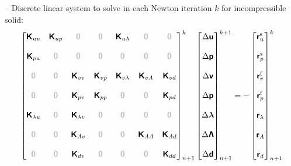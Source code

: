 \documentclass[a4paper,12pt]{report}
\newcommand{\bs}[1]{\boldsymbol{#1}}
\newcommand{\zerom}{\textcolor{lightgray}{\bs{\mathsf{0}}}}
\newcommand{\ROP}{\bs{\mathsf{r}}}
\newcommand{\LM}{\bs{\mathsf{\lambda}}}
\newcommand{\LMZ}{\bs{\mathsf{\Lambda}}}
\newcommand{\lmi}{\lambda} %
\newcommand{\lmzi}{\mathit{\Lambda}} %
\begin{document}
-- Discrete linear system to solve in each Newton iteration $k$ for incompressible solid:
\begin{equation}
\label{equation-lin-sys-fsi-0d-inc}
\begin{aligned}
\begin{bmatrix} \boldsymbol{\mathsf{K}}_{uu} & \boldsymbol{\mathsf{K}}_{up} & \zerom & \zerom & \boldsymbol{\mathsf{K}}_{u\lmi} & \zerom & \zerom \\ \\ \boldsymbol{\mathsf{K}}_{pu} & \zerom & \zerom & \zerom & \zerom & \zerom & \zerom \\ \\ \zerom & \zerom & \boldsymbol{\mathsf{K}}_{vv} & \boldsymbol{\mathsf{K}}_{vp} & \boldsymbol{\mathsf{K}}_{v\lmi} & \boldsymbol{\mathsf{K}}_{v\lmzi} & \boldsymbol{\mathsf{K}}_{vd} \\ \\ \zerom & \zerom & \boldsymbol{\mathsf{K}}_{pv} & \boldsymbol{\mathsf{K}}_{pp} & \zerom & \zerom & \boldsymbol{\mathsf{K}}_{pd} \\ \\ \boldsymbol{\mathsf{K}}_{\lmi u} & \zerom & \boldsymbol{\mathsf{K}}_{\lmi v} & \zerom & \zerom & \zerom & \zerom \\ \\ \zerom & \zerom & \boldsymbol{\mathsf{K}}_{\lmzi v} & \zerom & \zerom & \boldsymbol{\mathsf{K}}_{\lmzi \lmzi} & \boldsymbol{\mathsf{K}}_{\lmzi d} \\ \\ \zerom &  \zerom & \boldsymbol{\mathsf{K}}_{dv}  & \zerom & \zerom & \zerom & \boldsymbol{\mathsf{K}}_{dd} \end{bmatrix}_{n+1}^{k}\begin{bmatrix} \Delta\boldsymbol{\mathsf{u}} \\ \\ \Delta\boldsymbol{\mathsf{p}} \\ \\ \Delta\boldsymbol{\mathsf{v}} \\ \\ \Delta\boldsymbol{\mathsf{p}} \\ \\ \Delta\LM \\ \\ \Delta\LMZ \\ \\ \Delta\boldsymbol{\mathsf{d}} \end{bmatrix}_{n+1}^{k+1}=-\begin{bmatrix} \ROP_{u}^{\mathrm{s}} \\ \\ \ROP_{p}^{\mathrm{s}} \\ \\ \ROP_{v}^{\mathrm{f}} \\ \\ \ROP_{p}^{\mathrm{f}} \\ \\ \ROP_{\lmi} \\ \\ \ROP_{\lmzi} \\ \\ \ROP_{d}\end{bmatrix}_{n+1}^{k}

\end{aligned}
\end{equation}
\end{document}
